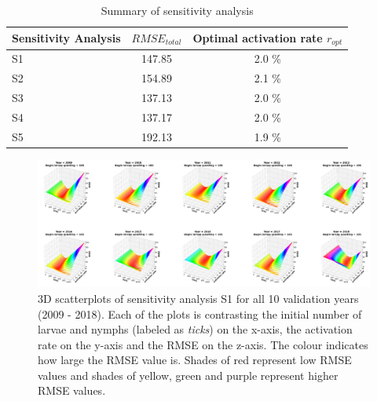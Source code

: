 \documentclass[a4paper, 11pt]{scrartcl}
\begin{document}
\begin{table}[h!]
\caption{Summary of sensitivity analysis}
\label{tab:summary}
\begin{tabularx}{\textwidth}{lcc}
\toprule
\textbf{Sensitivity Analysis} & \textbf{$RMSE_{total}$} & \textbf{Optimal activation rate $r_{opt}$} \\
\midrule
S1 & 147.85 & 2.0 \% \\
S2 & 154.89 & 2.1 \% \\
S3 & 137.13 & 2.0 \% \\
S4 & 137.17 & 2.0 \% \\
S5 & 192.13 & 1.9 \% \\
\bottomrule
\end{tabularx}
\end{table}



\printbibliography[heading = bibintoc, title = {Bibliography}]

\clearpage

\begin{figure}
\centering
\includegraphics[width=\linewidth]{figures/initial_ticks_with_beech_error_v1.png}
\caption{3D scatterplots of sensitivity analysis S1 for all 10 validation years (2009 - 2018). Each of the plots is contrasting the initial number of larvae and nymphs
(labeled as \textit{ticks}) on the x-axis, the activation rate on the y-axis and the RMSE on the z-axis. The colour indicates how large the RMSE value is. Shades of red
represent low RMSE values and shades of yellow, green and purple represent higher RMSE values.}
\label{fig:initial_ticks_with_beech_error_v1_roteted}
\end{figure}
\end{document}

